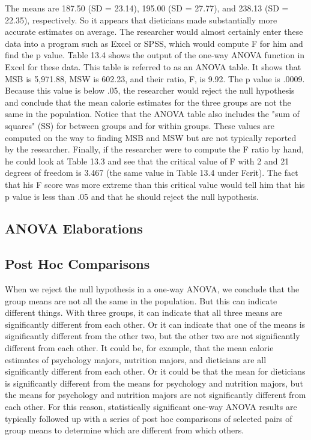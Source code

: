 The means are 187.50 (SD = 23.14), 195.00 (SD = 27.77), and 238.13 (SD = 22.35), respectively. So it appears
that dieticians made substantially more accurate estimates on average. The researcher would almost certainly enter these data into a program such as Excel or SPSS, which would compute F for him and find the p value. Table 13.4 shows the output of the one-way ANOVA function in Excel for these data. This table is referred to as an ANOVA table. It shows that MSB is 5,971.88, MSW is 602.23, and their ratio, F, is 9.92. The p value is .0009. Because this value is below .05, the researcher would reject the null hypothesis and conclude that the mean calorie estimates for the three groups are not the same in the population. Notice that the ANOVA table also includes the "sum of squares" (SS) for between groups and for within groups. These values are computed on the way to finding MSB and MSW but are not typically reported by the researcher. Finally, if the researcher were to compute the F ratio by hand, he could look at Table 13.3 and see that the critical value of F with 2 and 21 degrees of freedom is 3.467 (the same value in Table 13.4 under Fcrit). The fact that his F score was more extreme than this critical value would tell him that his p value is less than .05 and that he should reject the null hypothesis.


\subsection{ANOVA Elaborations}

\subsection{Post Hoc Comparisons}


When we reject the null hypothesis in a one-way ANOVA, we conclude that the group means are not all the same in the population. But this can indicate different things. With three groups, it can indicate that all three means are significantly different from each other. Or it can indicate that one of the means is significantly different from the other two, but the other two are not significantly different from each other. It could be, for example, that the mean calorie estimates of psychology majors, nutrition majors, and dieticians are all significantly different from
each other. Or it could be that the mean for dieticians is significantly different from the means for psychology and nutrition majors, but the means for psychology and nutrition majors are not significantly different from each other. For this reason, statistically significant one-way ANOVA results are typically followed up with a series of post hoc comparisons of selected pairs of group means to determine which are different from which others.


